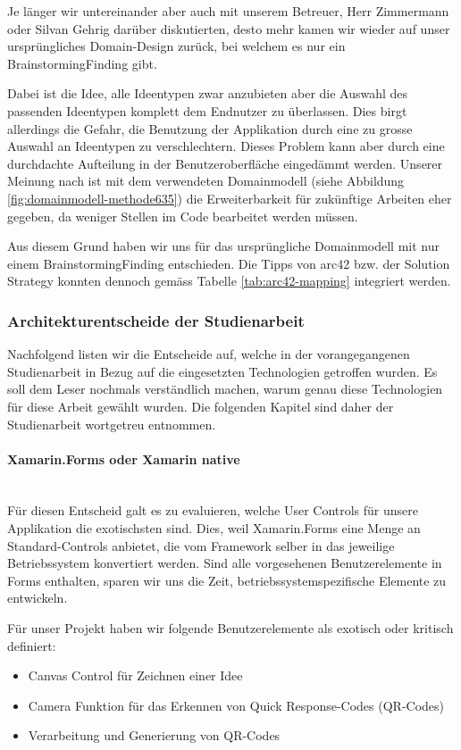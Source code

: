 Je länger wir untereinander aber auch mit unserem Betreuer, Herr Zimmermann oder Silvan Gehrig darüber diskutierten, desto mehr kamen wir wieder auf unser ursprüngliches Domain-Design zurück, bei welchem es nur ein BrainstormingFinding gibt. 

Dabei ist die Idee, alle Ideentypen zwar anzubieten aber die Auswahl des passenden Ideentypen komplett dem Endnutzer zu überlassen. Dies birgt allerdings die Gefahr, die Benutzung der Applikation durch eine zu grosse Auswahl an Ideentypen zu verschlechtern. Dieses Problem kann aber durch eine durchdachte Aufteilung in der Benutzeroberfläche eingedämmt werden. Unserer Meinung nach ist mit dem verwendeten Domainmodell (siehe Abbildung \ref{fig:domainmodell-methode635}) die Erweiterbarkeit für zukünftige Arbeiten eher gegeben, da weniger Stellen im Code bearbeitet werden müssen. 

Aus diesem Grund haben wir uns für das ursprüngliche Domainmodell mit nur einem BrainstormingFinding entschieden. Die Tipps von arc42 bzw. der Solution Strategy konnten dennoch gemäss Tabelle \ref{tab:arc42-mapping} integriert werden.

\subsubsection{Architekturentscheide der Studienarbeit}
Nachfolgend listen wir die Entscheide auf, welche in der vorangegangenen Studienarbeit in Bezug auf die eingesetzten Technologien getroffen wurden. Es soll dem Leser nochmals  verständlich machen, warum genau diese Technologien für diese Arbeit gewählt wurden.
Die folgenden Kapitel sind daher der Studienarbeit \cite{methode635-sa} wortgetreu entnommen.

\paragraph*{Xamarin.Forms oder Xamarin native}\label{subsubsec:forms-vs-native}~\\
Für diesen Entscheid galt es zu evaluieren, welche User Controls für unsere Applikation die exotischsten sind. Dies, weil Xamarin.Forms eine Menge an Standard-Controls anbietet, die vom Framework selber in das jeweilige Betriebssystem konvertiert werden. Sind alle vorgesehenen Benutzerelemente in Forms enthalten, sparen wir uns die Zeit, betriebssystemspezifische Elemente zu entwickeln. 

Für unser Projekt haben wir folgende Benutzerelemente als exotisch oder kritisch definiert:
\begin{itemize}
	\item Canvas Control für Zeichnen einer Idee
	\item Camera Funktion für das Erkennen von Quick Response-Codes (QR-Codes)
	\item Verarbeitung und Generierung von QR-Codes
\end{itemize}

